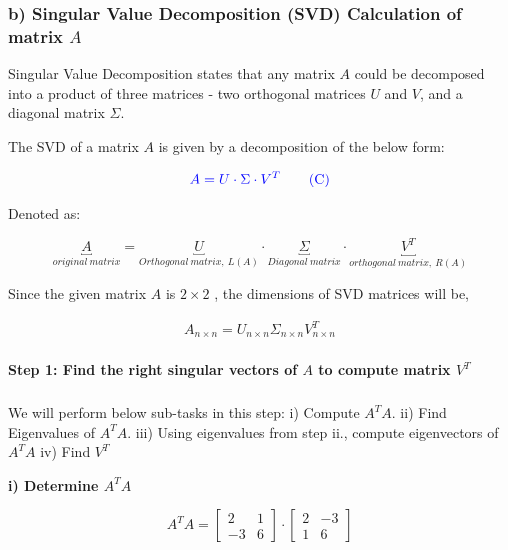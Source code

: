 \documentclass[a4paper]{report}
\begin{document}
\subsubsection*{b) Singular Value Decomposition (SVD) Calculation of matrix $A$}

Singular Value Decomposition states that any matrix $A$ could be decomposed into a product of three matrices - two orthogonal matrices $U$ and $V$, and a diagonal matrix $\Sigma$.


The SVD of a matrix $A$ is given by a decomposition of the below form:

\begin{equation}
    \color{blue} A=U\cdot \Sigma \cdot V^T \tag{C}
\end{equation}

\newpage
Denoted as:

\begin{equation}
    \underbracket{A}_{original\ matrix}=\underbracket{U}_{Orthogonal\ matrix,\ L(A)} \cdot \underbracket{\Sigma}_{Diagonal\ matrix} \cdot \underbracket{ V^T}_{orthogonal\ matrix,\ R(A)} 
\end{equation}


\vspace{5mm}
Since the given matrix $A$ is $2\times 2$ , the dimensions of SVD matrices will be,

\begin{align*}
    A_{n\times n}=U_{n\times n}\Sigma _{n\times n} V^T_{n\times n}
\end{align*}



\paragraph{Step 1: Find the right singular vectors of $A$ to compute matrix $V^T$}

\subparagraph{}

We will perform below sub-tasks in this step:
\newline i) Compute $A^TA$. 
\newline ii) Find Eigenvalues of $A^TA$.
\newline iii) Using eigenvalues from step ii., compute eigenvectors of $A^TA$
\newline iv) Find $V^T$

\textbf{i) Determine $A^TA$}


\[ A^TA =\begin{bmatrix}
    2&1\\-3&6
\end{bmatrix} \cdot \begin{bmatrix}
    2&-3\\1&6
\end{bmatrix}\]
\end{document}

